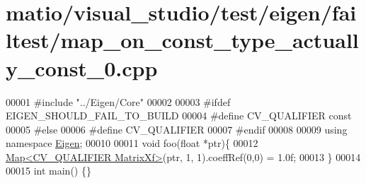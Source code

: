 \hypertarget{matio_2visual__studio_2test_2eigen_2failtest_2map__on__const__type__actually__const__0_8cpp_source}{}\section{matio/visual\+\_\+studio/test/eigen/failtest/map\+\_\+on\+\_\+const\+\_\+type\+\_\+actually\+\_\+const\+\_\+0.cpp}
\label{matio_2visual__studio_2test_2eigen_2failtest_2map__on__const__type__actually__const__0_8cpp_source}

\begin{DoxyCode}
00001 \textcolor{preprocessor}{#include "../Eigen/Core"}
00002 
00003 \textcolor{preprocessor}{#ifdef EIGEN\_SHOULD\_FAIL\_TO\_BUILD}
00004 \textcolor{preprocessor}{#define CV\_QUALIFIER const}
00005 \textcolor{preprocessor}{#else}
00006 \textcolor{preprocessor}{#define CV\_QUALIFIER}
00007 \textcolor{preprocessor}{#endif}
00008 
00009 \textcolor{keyword}{using namespace }\hyperlink{namespace_eigen}{Eigen};
00010 
00011 \textcolor{keywordtype}{void} foo(\textcolor{keywordtype}{float} *ptr)\{
00012     \hyperlink{group___core___module_class_eigen_1_1_map}{Map<CV\_QUALIFIER MatrixXf>}(ptr, 1, 1).coeffRef(0,0) = 1.0f;
00013 \}
00014 
00015 \textcolor{keywordtype}{int} main() \{\}
\end{DoxyCode}
